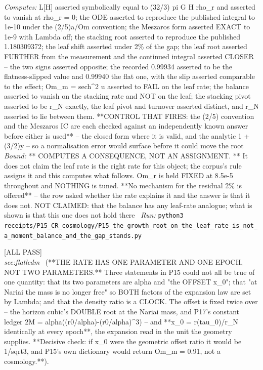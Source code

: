 \begin{description}
\emph{Computes:} L[H] asserted symbolically equal to (32/3) pi G H rho\_r and asserted to vanish at rho\_r = 0; the ODE asserted to reproduce the published integral to 1e-10 under the (2/5)a/Om convention; the Meszaros form asserted EXACT to 1e-9 with Lambda off; the stacking root asserted to reproduce the published 1.180309372; the leaf shift asserted under 2\% of the gap; the leaf root asserted FURTHER from the measurement and the continued integral asserted CLOSER -- the two signs asserted opposite; the recorded 0.99934 asserted to be the flatness-slipped value and 0.99940 the flat one, with the slip asserted comparable to the effect; Om\_m = sech\textasciicircum{}2 u asserted to FAIL on the leaf rate; the balance asserted to vanish on the stacking rate and NOT on the leaf; the stacking pivot asserted to be r\_N exactly, the leaf pivot and turnover asserted distinct, and r\_N asserted to lie between them. **CONTROL THAT FIRES: the (2/5) convention and the Meszaros IC are each checked against an independently known answer before either is used** -- the closed form where it is valid, and the analytic 1 + (3/2)y -- so a normalisation error would surface before it could move the root
 \emph{Bound:} ** COMPUTES A CONSEQUENCE, NOT AN ASSIGNMENT. ** It does not claim the leaf rate is the right rate for this object; the corpus's rule assigns it and this computes what follows. Om\_r is held FIXED at 8.5e-5 throughout and NOTHING is tuned. **No mechanism for the residual 2\% is offered** -- the row asked whether the rate explains it and the answer is that it does not. NOT CLAIMED: that the balance has any leaf-rate analogue; what is shown is that this one does not hold there
\ \emph{Run:} \texttt{python3 receipts/P15\_CR\_cosmology/P15\_the\_growth\_root\_on\_the\_leaf\_rate\_is\_not\_a\_moment\_balance\_and\_the\_gap\_stands.py}
\item[\rcptlabel{P15_the_rate_has_one_parameter_and_one_epoch}{P15R14}\textbf{P15R14}\quad\texttt{P15\_the\_rate\_has\_one\_parameter\_and\_one\_epoch}]\hfill\textsf{[ALL PASS]}\\
\textit{sec:flatlcdm} \ (**THE RATE HAS ONE PARAMETER AND ONE EPOCH, NOT TWO PARAMETERS.** Three statements in P15 could not all be true of one quantity: that its two parameters are alpha and "the OFFSET x\_0"; that "at Nariai the mass is no longer free" so BOTH factors of the expansion law are set by Lambda; and that the density ratio is a CLOCK. The offset is fixed twice over -- the horizon cubic's DOUBLE root at the Nariai mass, and P17's constant ledger 2M = alpha((r0/alpha)-(r0/alpha)\textasciicircum{}3) -- and **x\_0 = r(tau\_0)/r\_N identically at every epoch**, the expansion read in the unit the geometry supplies. **Decisive check: if x\_0 were the geometric offset ratio it would be 1/sqrt3, and P15's own dictionary would return Om\_m = 0.91, not a cosmology.**). 

\end{description}
